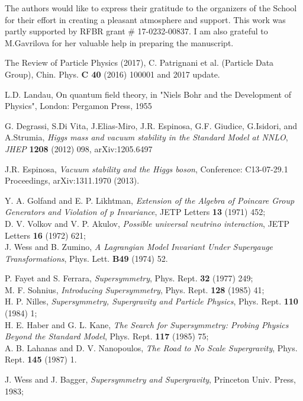 \documentclass{cernyrep}
\begin{document}
The authors would like to express their gratitude to the
organizers of the School for their effort in creating a pleasant atmosphere and support. This work was partly supported by RFBR grant \# 17-0232-00837. I am also grateful to M.Gavrilova for her valuable help in preparing the manuscript.
\begin{thebibliography}{100}
 The Review of Particle Physics (2017),
C. Patrignani et al. (Particle Data Group), Chin. Phys. {\bf C 40} (2016) 100001  and 2017 update.

  L.D. Landau, On quantum field theory,  in "Niels Bohr and the Development of Physics",  London: Pergamon Press, 1955

G. Degrassi, S.Di Vita, J.Elias-Miro, J.R. Espinosa, G.F. Giudice, G.Isidori, and A.Strumia, {\it Higgs mass and vacuum stability in the Standard Model at NNLO}, {\it JHEP} {\bf 1208} (2012) 098, arXiv:1205.6497 

J.R. Espinosa, {\it Vacuum stability and the Higgs boson}, Conference: C13-07-29.1 Proceedings, arXiv:1311.1970 (2013).

Y. A. Golfand and E. P. Likhtman, {\it Extension of the Algebra of Poincare Group Generators and Violation of p Invariance},
JETP Letters {\bf 13} (1971) 452;\\
D. V. Volkov and V. P. Akulov, {\it Possible universal neutrino interaction},
JETP Letters {\bf 16} (1972) 621;\\
J. Wess and B. Zumino, {\it A Lagrangian Model Invariant Under Supergauge Transformations},
Phys. Lett. {\bf B49} (1974) 52.

P. Fayet and S. Ferrara, {\it Supersymmetry},
Phys. Rept. {\bf 32} (1977) 249;\\
M. F. Sohnius, {\it Introducing Supersymmetry},
Phys. Rept. {\bf 128} (1985) 41;\\
H. P. Nilles, {\it Supersymmetry, Supergravity and Particle Physics},
Phys. Rept. {\bf 110} (1984) 1;\\
H. E. Haber and G. L. Kane, {\it The Search for Supersymmetry: Probing Physics Beyond the Standard Model},
Phys. Rept. {\bf 117} (1985) 75;\\
A. B. Lahanas and D. V. Nanopoulos, {\it The Road to No Scale Supergravity},
Phys. Rept. {\bf 145} (1987) 1.

J. Wess and J. Bagger, {\em Supersymmetry and Supergravity}, Princeton Univ. Press, 1983;




\end{thebibliography}
\end{document}
